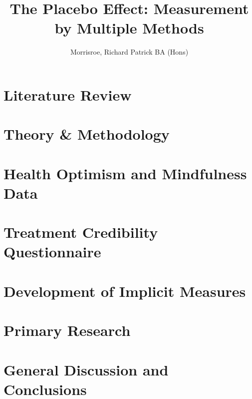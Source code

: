 \documentclass[apsych, phd]{uccthesis}
\title{The Placebo Effect: Measurement by Multiple Methods}
\author{Morrisroe, Richard Patrick BA (Hons)}
\begin{document}


\tableofcontents

\label{cha:intr-rese}


\chapter{Literature Review}
\label{cha:literature-review}


\chapter{Theory \& Methodology}
\label{cha:methodology}


\chapter{Health Optimism and Mindfulness Data}
\label{cha:health-for-thesis}


\chapter{Treatment Credibility Questionnaire}
\label{cha:tcq-thesis}


\chapter{Development of Implicit Measures}
\label{cha:devel-impl-meas}
% 


\chapter{Primary Research}
\label{cha:primary-research}


\chapter{General Discussion and Conclusions}
\label{cha:general-discussion}




\end{document}
